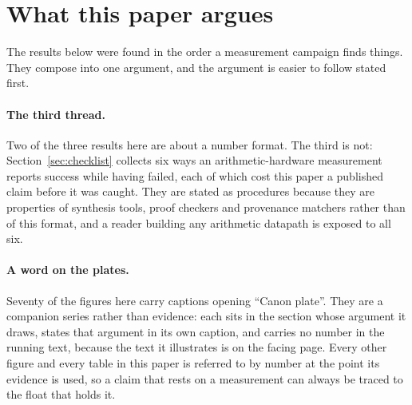 \documentclass[11pt]{article}
\theoremstyle{definition}
\begin{document}
\begin{abstract}
\textbf{The third contribution is methodological and is not about ternary.}
Section~\ref{sec:checklist} states six ways an arithmetic-hardware result dies
while reporting success, each found in our own numbers and each costing us a
published claim: a synthesiser that folds away the on-die checks whose area is
being measured; a frequency column that is a size proxy rather than a figure of
merit; a proof base with no admitted lemmas that never type-checked; a decoder
that accepts codes its format cannot name and so flatters it; substring matching
that sources a figure to unrelated digits; and a provenance chain that ends at a
document restating the number rather than at the tool that produced it. Each is
given as a procedure a reader can run against their own corpus. None was caught
by review; all six were caught by re-running something that had already passed.

The artefacts are at \url{https://github.com/gHashTag/ternary-network-floats}:
\texttt{python3 verify.py} recomputes the tables above from the reference
oracle and fails if any number moves, and \texttt{coqc proofs/CorePhi.v}
checks the algebra.
\end{abstract}

\section{What this paper argues}
\label{sec:roadmap}

The results below were found in the order a measurement campaign finds things.
They compose into one argument, and the argument is easier to follow stated
first.

\paragraph{The third thread.} Two of the three results here are about a number
format. The third is not: Section~\ref{sec:checklist} collects six ways an
arithmetic-hardware measurement reports success while having failed, each of
which cost this paper a published claim before it was caught. They are stated as
procedures because they are properties of synthesis tools, proof checkers and
provenance matchers rather than of this format, and a reader building any
arithmetic datapath is exposed to all six.

\paragraph{A word on the plates.} Seventy of the figures here carry captions
opening ``Canon plate''. They are a companion series rather than evidence: each
sits in the section whose argument it draws, states that argument in its own
caption, and carries no number in the running text, because the text it
illustrates is on the facing page. Every other figure and every table in this
paper is referred to by number at the point its evidence is used, so a claim
that rests on a measurement can always be traced to the float that holds it.
\end{document}
